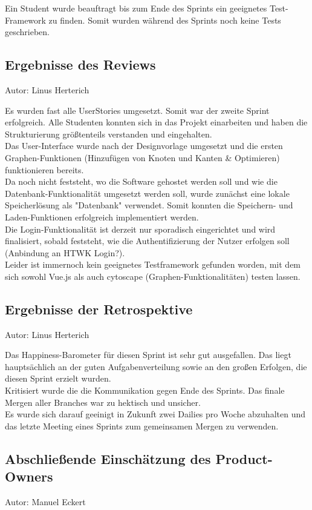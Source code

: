 Ein Student wurde beauftragt bis zum Ende des Sprints ein geeignetes Test-Framework zu finden.
Somit wurden während des Sprints noch keine Tests geschrieben.

\subsection{Ergebnisse des Reviews}
{\small Autor: Linus Herterich}

Es wurden fast alle UserStories umgesetzt. Somit war der zweite Sprint erfolgreich.
Alle Studenten konnten sich in das Projekt einarbeiten und haben die Strukturierung
größtenteils verstanden und eingehalten.
\\ Das User-Interface wurde nach der Designvorlage umgesetzt und die ersten Graphen-Funktionen
(Hinzufügen von Knoten und Kanten \& Optimieren) funktionieren bereits.
\\ Da noch nicht feststeht, wo die Software gehostet werden soll und wie die Datenbank-Funktionalität
umgesetzt werden soll, wurde zunächst eine lokale Speicherlösung als "Datenbank" verwendet. Somit konnten
die Speichern- und Laden-Funktionen erfolgreich implementiert werden.
\\ Die Login-Funktionalität ist derzeit nur sporadisch eingerichtet und wird finalisiert,
sobald feststeht, wie die Authentifizierung der Nutzer erfolgen soll (Anbindung an HTWK Login?).
\\ Leider ist immernoch kein geeignetes Testframework gefunden worden, mit dem sich sowohl Vue.js
als auch cytoscape (Graphen-Funktionalitäten) testen lassen.

\subsection{Ergebnisse der Retrospektive}
{\small Autor: Linus Herterich}

Das Happiness-Barometer für diesen Sprint ist sehr gut ausgefallen. Das liegt hauptsächlich an der guten Aufgabenverteilung
sowie an den großen Erfolgen, die diesen Sprint erzielt wurden.
\\ Kritisiert wurde die die Kommunikation gegen Ende des Sprints. Das finale Mergen aller Branches war zu hektisch und unsicher.
\\ Es wurde sich darauf geeinigt in Zukunft zwei Dailies pro Woche abzuhalten und das letzte Meeting eines Sprints zum gemeinsamen Mergen zu verwenden.

\subsection{Abschließende Einschätzung des Product-Owners}
{\small Autor: Manuel Eckert}

